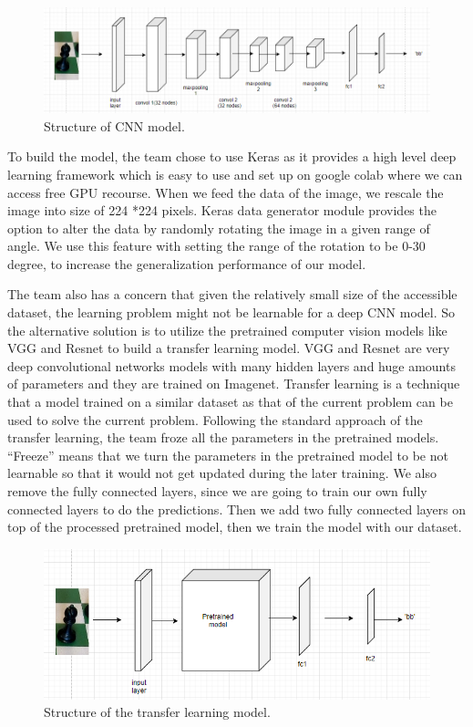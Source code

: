 \documentclass[a4paper,12pt]{article}
\begin{document}
\begin{spacing}{1.3}
\begin{figure}[H]
	\centering
	\includegraphics[scale=0.4]{8.png}
	\caption{Structure of CNN model.}
\end{figure}

To build the model, the team chose to use Keras as it provides a high level deep learning framework which is easy to use and set up on google colab where we can access free GPU recourse.  When we feed the data of the image, we rescale the image into size of 224 *224 pixels. Keras data generator module provides the option to alter the data by randomly rotating the image in a given range of angle. We use this feature with setting the range of the rotation to be 0-30 degree, to increase the generalization performance of our model. 

The team also has a concern that given the relatively small size of the accessible dataset, the learning problem might not be learnable for a deep CNN model. So the alternative solution is to utilize the pretrained computer vision models like VGG and Resnet to build a transfer learning model. VGG and Resnet are very deep convolutional networks models with many hidden layers and huge amounts of parameters and they are trained on Imagenet. Transfer learning is a technique that a model trained on a similar dataset as that of the current problem can be used to solve the current problem. Following the standard approach of the transfer learning, the team froze all the parameters in the pretrained models. “Freeze” means that we turn the parameters in the pretrained model to be not learnable so that it would not get updated during the later training. We also remove the fully connected layers, since we are going to train our own fully connected layers to do the predictions. Then we add two fully connected layers on top of the processed pretrained model, then we train the model with our dataset.

\begin{figure}[H]
	\centering
	\includegraphics[scale=0.4]{9.png}
	\caption{Structure of the transfer learning model.}
\end{figure}


\end{spacing}
\end{document}
